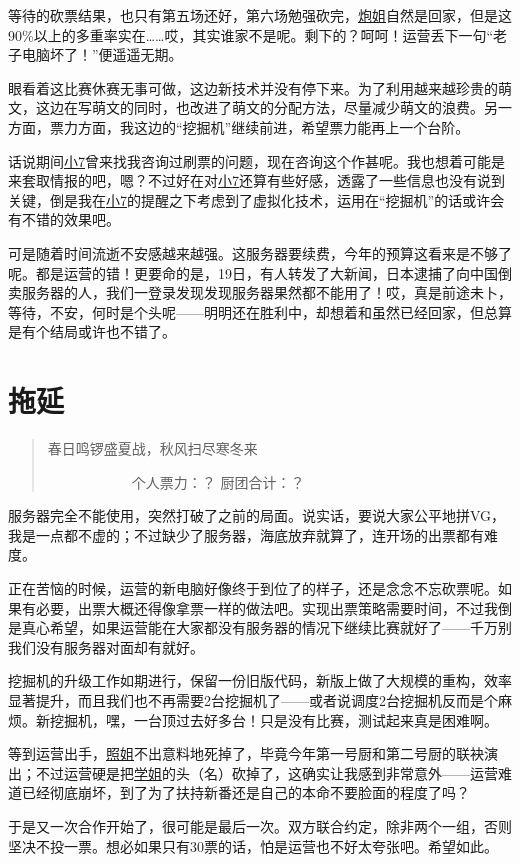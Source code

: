 等待的砍票结果，也只有第五场还好，第六场勉强砍完，\uline{炮姐}自然是回家，但是这90\%以上的多重率实在……哎，其实谁家不是呢。剩下的？呵呵！运营丢下一句“老子电脑坏了！”便遥遥无期。

眼看着这比赛休赛无事可做，这边新技术并没有停下来。为了利用越来越珍贵的萌文，这边在写萌文的同时，也改进了萌文的分配方法，尽量减少萌文的浪费。另一方面，票力方面，我这边的“挖掘机”继续前进，希望票力能再上一个台阶。

话说期间\uline{小7}曾来找我咨询过刷票的问题，现在咨询这个作甚呢。我也想着可能是来套取情报的吧，嗯？不过好在对\uline{小7}还算有些好感，透露了一些信息也没有说到关键，倒是我在\uline{小7}的提醒之下考虑到了虚拟化技术，运用在“挖掘机”的话或许会有不错的效果吧。

可是随着时间流逝不安感越来越强。这服务器要续费，今年的预算这看来是不够了呢。都是运营的错！更要命的是，19日，有人转发了大新闻，日本逮捕了向中国倒卖服务器的人，我们一登录发现发现服务器果然都不能用了！哎，真是前途未卜，等待，不安，何时是个头呢——明明还在胜利中，却想着和虽然已经回家，但总算是有个结局或许也不错了。

\chapter{拖延}
\begin{quote}
春日鸣锣盛夏战，秋风扫尽寒冬来

　　　　　　个人票力：？ 厨团合计：？
\end{quote}

服务器完全不能使用，突然打破了之前的局面。说实话，要说大家公平地拼VG，我是一点都不虚的；不过缺少了服务器，海底放弃就算了，连开场的出票都有难度。

正在苦恼的时候，运营的新电脑好像终于到位了的样子，还是念念不忘砍票呢。如果有必要，出票大概还得像拿票一样的做法吧。实现出票策略需要时间，不过我倒是真心希望，如果运营能在大家都没有服务器的情况下继续比赛就好了——千万别我们没有服务器对面却有就好。

挖掘机的升级工作如期进行，保留一份旧版代码，新版上做了大规模的重构，效率显著提升，而且我们也不再需要2台挖掘机了——或者说调度2台挖掘机反而是个麻烦。新挖掘机，嘿，一台顶过去好多台！只是没有比赛，测试起来真是困难啊。

等到运营出手，\uline{照姐}不出意料地死掉了，毕竟今年第一号厨和第二号厨的联袂演出；不过运营硬是把\uline{学姐}的头（名）砍掉了，这确实让我感到非常意外——运营难道已经彻底崩坏，到了为了扶持新番还是自己的本命不要脸面的程度了吗？

于是又一次合作开始了，很可能是最后一次。双方联合约定，除非两个一组，否则坚决不投一票。想必如果只有30票的话，怕是运营也不好太夸张吧。希望如此。

